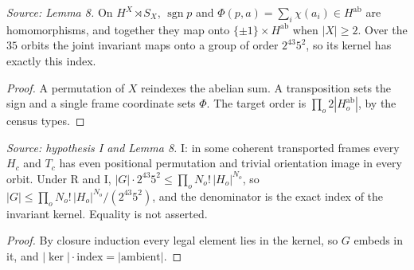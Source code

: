 \begin{lemma}
  \label{lem:invariants}
  \leanok
  \textit{Source: Lemma 8.}
  On \(H^X\rtimes S_X\), \(\operatorname{sgn}p\) and
  \(\Phi(p,a)=\sum_i\chi(a_i)\in H^{\mathrm{ab}}\) are homomorphisms, and
  together they map onto \(\{\pm1\}\times H^{\mathrm{ab}}\) when
  \(|X|\ge2\). Over the \(35\) orbits the joint invariant maps onto a group
  of order \(2^{43}5^2\), so its kernel has exactly this index.
\end{lemma}
\begin{proof}
  \leanok
  A permutation of \(X\) reindexes the abelian sum. A transposition sets
  the sign and a single frame coordinate sets \(\Phi\). The target order
  is \(\prod_o2|H_o^{\mathrm{ab}}|\), by the census types.
\end{proof}

\begin{theorem}
  \label{thm:invariant-bound}
  \leanok
  \textit{Source: hypothesis I and Lemma 8.}
  I: in some coherent transported frames every \(H_c\) and \(T_c\) has even
  positional permutation and trivial orientation image in every orbit.
  Under R and I,
  \(|G|\cdot2^{43}5^2\le\prod_oN_o!\,|H_o|^{N_o}\), so
  \(|G|\le\prod_oN_o!\,|H_o|^{N_o}/(2^{43}5^2)\), and the denominator is
  the exact index of the invariant kernel. Equality is not asserted.
\end{theorem}
\begin{proof}
  \leanok
  By closure induction every legal element lies in the kernel, so \(G\)
  embeds in it, and \(|\ker|\cdot\mathrm{index}=|\text{ambient}|\).
\end{proof}


